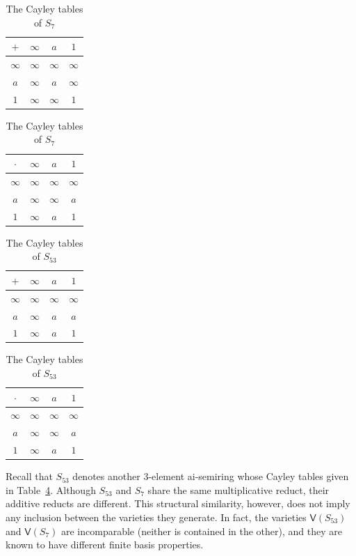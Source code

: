 \documentclass[reqno]{amsart}
\theoremstyle{plain}
\theoremstyle{definition}
\begin{document}
\begin{table}[ht]
\caption{The Cayley tables of $S_7$} \label{tb24111401}
\begin{tabular}{c|ccc}
$+$      &$\infty$&$a$&$1$\\
\hline
$\infty$ &$\infty$&$\infty$&$\infty$\\
$a$      &$\infty$&$a$&$\infty$\\
$1$      &$\infty$&$\infty$&$1$\\
\end{tabular}\qquad
\begin{tabular}{c|ccc}
$\cdot$  &$\infty$&$a$&$1$\\
\hline
$\infty$ &$\infty$&$\infty$&$\infty$\\
$a$      &$\infty$&$\infty$&$a$\\
$1$      &$\infty$&$a$&$1$\\
\end{tabular}
\end{table}

\begin{table}[ht]
\caption{The Cayley tables of $S_{53}$} \label{tb53}
\begin{tabular}{c|ccc}
$+$      &$\infty$&$a$&$1$\\
\hline
$\infty$ &$\infty$&$\infty$&$\infty$\\
$a$      &$\infty$&$a$&$a$\\
$1$      &$\infty$&$a$&$1$\\
\end{tabular}\qquad
\begin{tabular}{c|ccc}
$\cdot$  &$\infty$&$a$&$1$\\
\hline
$\infty$ &$\infty$&$\infty$&$\infty$\\
$a$      &$\infty$&$\infty$&$a$\\
$1$      &$\infty$&$a$&$1$\\
\end{tabular}
\end{table}

Recall that $S_{53}$ denotes another $3$-element ai-semiring whose Cayley tables given in Table~\ref{tb53}.
Although $S_{53}$ and $S_7$ share the same multiplicative reduct, their additive reducts are different.
This structural similarity, however, does not imply any inclusion between the varieties they generate.
In fact, the varieties $\mathsf{V}(S_{53})$ and $\mathsf{V}(S_{7})$ are incomparable (neither is contained in the other),
and they are known to have different finite basis properties.
\end{document}

